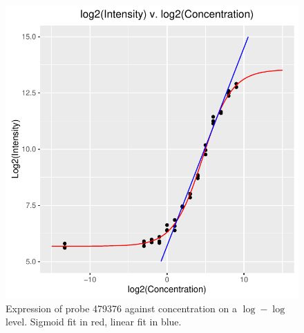 \documentclass[reqno,12pt,oneside]{report}\usepackage[]{graphicx}\usepackage[]{color}
\makeatletter
\def\maxwidth{ %
  \ifdim\Gin@nat@width>\linewidth
    \linewidth
  \else
    \Gin@nat@width
  \fi
}
\newenvironment{knitrout}{}{} %
\renewenvironment{knitrout}{\begin{small}}{\end{small}}
\theoremstyle{plain}
\theoremstyle{definition}
\theoremstyle{remark}
\numberwithin{theorem}{chapter}     %
\makeatother
\begin{document}
\begin{figure}[ht]
  \centering
\begin{knitrout}
\color{fgcolor}
\includegraphics[width=\maxwidth]{figure/chap4-fig3-1} 

\end{knitrout}
\caption{Expression of probe 479376 against concentration on a $\log-\log$ level. Sigmoid fit in red, linear fit in blue.}
  \label{fig:c3}
\end{figure}  
\end{document}
